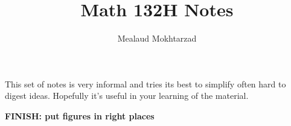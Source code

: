 \documentclass{article}
\title{Math 132H Notes}
\author{Mealaud Mokhtarzad}
\date{}
\begin{document}
\maketitle

This set of notes is very informal and tries its best to simplify often hard to digest ideas. Hopefully it's useful in your learning of the material.

\textbf{FINISH: put figures in right places}

\newpage

\renewcommand{\headrulewidth}{0pt}
\tableofcontents
\newpage

\renewcommand{\headrulewidth}{0.4pt}


\newpage

\end{document}
